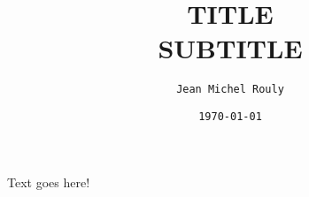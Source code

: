 \documentclass[letterpaper,10pt]{article}
\title{
  \huge TITLE \\ 
  \large SUBTITLE
}
\author{\texttt{Jean Michel Rouly}}
\date{\texttt{\today}}
\begin{document}
\maketitle

Text goes here!
\end{document}
